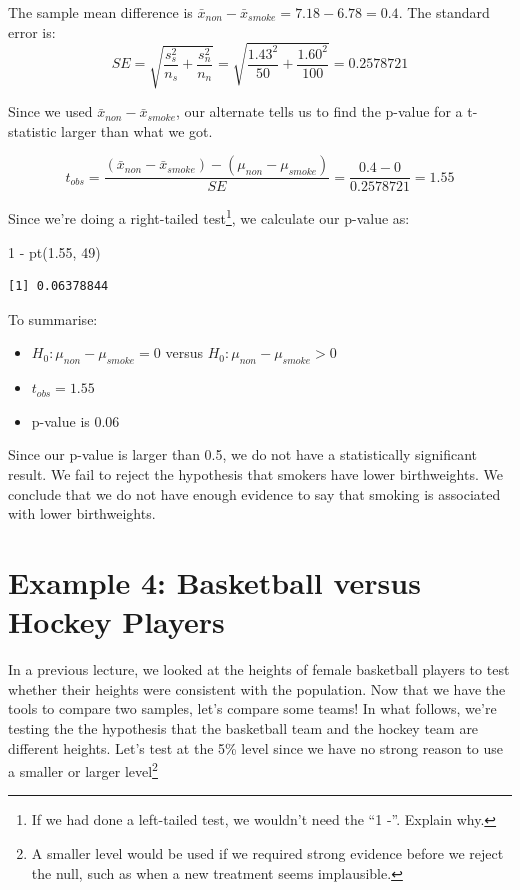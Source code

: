 \documentclass[
  letterpaper,
  DIV=11,
  numbers=noendperiod,
  oneside]{scrreprt}
\newenvironment{Shaded}{\begin{snugshade}}{\end{snugshade}}
\newcommand{\DecValTok}[1]{\textcolor[rgb]{0.68,0.00,0.00}{#1}}
\newcommand{\FloatTok}[1]{\textcolor[rgb]{0.68,0.00,0.00}{#1}}
\newcommand{\FunctionTok}[1]{\textcolor[rgb]{0.28,0.35,0.67}{#1}}
\newcommand{\NormalTok}[1]{\textcolor[rgb]{0.00,0.23,0.31}{#1}}
\newcommand{\SpecialCharTok}[1]{\textcolor[rgb]{0.37,0.37,0.37}{#1}}
\providecommand{\tightlist}{%
  \setlength{\itemsep}{0pt}\setlength{\parskip}{0pt}}\usepackage{longtable,booktabs,array}
\begin{document}
The sample mean difference is
\(\bar x_{non} - \bar x_{smoke} = 7.18 - 6.78 = 0.4\). The standard
error is: \[
SE = \sqrt{\dfrac{s_s^2}{n_s} + \dfrac{s_n^2}{n_n}} = \sqrt{\dfrac{1.43^2}{50} + \dfrac{1.60^2}{100}} = 0.2578721
\]

Since we used \(\bar x_{non} - \bar x_{smoke}\), our alternate tells us
to find the p-value for a t-statistic larger than what we got.

\[
t_{obs} = \dfrac{(\bar x_{non} - \bar x_{smoke}) - (\mu_{non} - \mu_{smoke})}{SE} = \dfrac{0.4 - 0}{0.2578721} = 1.55
\]

Since we're doing a right-tailed test\footnote{If we had done a
  left-tailed test, we wouldn't need the ``1 -''. Explain why.}, we
calculate our p-value as:

\begin{Shaded}
\begin{Highlighting}[]
\DecValTok{1} \SpecialCharTok{{-}} \FunctionTok{pt}\NormalTok{(}\FloatTok{1.55}\NormalTok{, }\DecValTok{49}\NormalTok{)}
\end{Highlighting}
\end{Shaded}

\begin{verbatim}
[1] 0.06378844
\end{verbatim}

To summarise:

\begin{itemize}
\tightlist
\item
  \(H_0: \mu_{non} - \mu_{smoke} = 0\) versus
  \(H_0: \mu_{non} - \mu_{smoke} > 0\)
\item
  \(t_{obs} = 1.55\)
\item
  p-value is 0.06
\end{itemize}

Since our p-value is larger than 0.5, we do not have a statistically
significant result. We fail to reject the hypothesis that smokers have
lower birthweights. We conclude that we do not have enough evidence to
say that smoking is associated with lower birthweights.

\hypertarget{example-4-basketball-versus-hockey-players}{%
\section{Example 4: Basketball versus Hockey
Players}\label{example-4-basketball-versus-hockey-players}}

In a previous lecture, we looked at the heights of female basketball
players to test whether their heights were consistent with the
population. Now that we have the tools to compare two samples, let's
compare some teams! In what follows, we're testing the the hypothesis
that the basketball team and the hockey team are different heights.
Let's test at the 5\% level since we have no strong reason to use a
smaller or larger level\footnote{A smaller level would be used if we
  required strong evidence before we reject the null, such as when a new
  treatment seems implausible.}
\end{document}
